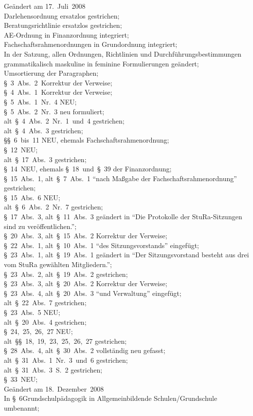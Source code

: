 Geändert am 17.~Juli~2008\\
Darlehensordnung ersatzlos gestrichen;\\
Beratungsrichtlinie ersatzlos gestrichen;\\
AE-Ordnung in Finanzordnung integriert;\\
Fachschaftsrahmenordnungen in Grundordnung integriert;\\
In der Satzung, allen Ordnungen, Richtlinien und Durchführungsbestimmungen grammatikalisch maskuline in feminine Formulierungen geändert;\\
Umsortierung der Paragraphen;\\
§~3~Abs.~2~Korrektur der Verweise;\\
§~4~Abs.~1~Korrektur der Verweise;\\
§~5~Abs.~1~Nr.~4 NEU;\\
§~5~Abs.~2~Nr.~3 neu formuliert;\\
alt~§~4~Abs.~2~Nr.~1~und~4 gestrichen;\\
alt~§~4~Abs.~3 gestrichen;\\
§§~6~bis~11 NEU, ehemals Fachschaftsrahmenordnung;\\
§~12~NEU;\\
alt~§~17~Abs.~3 gestrichen;\\
§~14~NEU, ehemals §~18~und~§~39 der Finanzordnung;\\
§~15~Abs.~1, alt~§~7~Abs.~1 "`nach Maßgabe der Fachschaftsrahmenordnung"' gestrichen;\\
§~15~Abs.~6 NEU;\\
alt~§~6~Abs.~2~Nr.~7 gestrichen;\\
§~17~Abs.~3, alt~§~11~Abs.~3 geändert in "`Die Protokolle der StuRa-Sitzungen sind zu veröffentlichen."';\\
§~20~Abs.~3, alt~§~15~Abs.~2 Korrektur der Verweise;\\
§~22~Abs.~1, alt~§~10~Abs.~1 "`des Sitzungsvorstands"' eingefügt;\\
§~23~Abs.~1, alt~§~19~Abs.~1 geändert in "`Der Sitzungsvorstand besteht aus drei vom StuRa gewählten Mitgliedern."';\\
§~23~Abs.~2, alt~§~19~Abs.~2 gestrichen;\\
§~23~Abs.~3, alt~§~20~Abs.~2 Korrektur der Verweise;\\
§~23~Abs.~4, alt~§~20~Abs.~3 "`und Verwaltung"' eingefügt;\\
alt~§~22~Abs.~7 gestrichen;\\
§~23~Abs.~5 NEU;\\
alt~§~20~Abs.~4 gestrichen;\\
§~24,~25,~26,~27 NEU;\\
alt~§§~18,~19,~23,~25,~26,~27 gestrichen;\\
§~28~Abs.~4, alt~§~30~Abs.~2 vollständig neu gefasst;\\
alt~§~31~Abs.~1~Nr.~3~und~6 gestrichen;\\
alt~§~31~Abs.~3~S.~2 gestrichen;\\
§~33~NEU;\\
Geändert am 18.~Dezember~2008\\
In §~6Grundschulpädagogik in Allgemeinbildende Schulen/Grundschule umbenannt;

